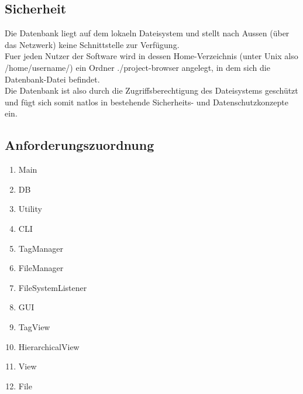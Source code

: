\documentclass[10pt,paper=a4,final]{scrartcl}
\begin{document}
\subsection{Sicherheit}
Die Datenbank liegt auf dem lokaeln Dateisystem und stellt nach Aussen (\"uber das Netzwerk) keine Schnittstelle zur Verf\"ugung.\\
Fuer jeden Nutzer der Software wird in dessen Home-Verzeichnis (unter Unix also /home/username/) ein Ordner ./project-browser angelegt, in dem sich die Datenbank-Datei befindet.\\
Die Datenbank ist also durch die Zugriffsberechtigung des Dateisystems gesch\"utzt und f\"ugt sich somit natlos in bestehende Sicherheits- und Datenschutzkonzepte ein.
\subsection{Anforderungszuordnung}
\begin{enumerate}
  \item Main
  \item DB
  \item Utility
  \item CLI
  \item TagManager
  \item FileManager
  \item FileSystemListener
  \item GUI
  \item TagView
  \item HierarchicalView
  \item View
  \item File
\end{enumerate}
\end{document}

